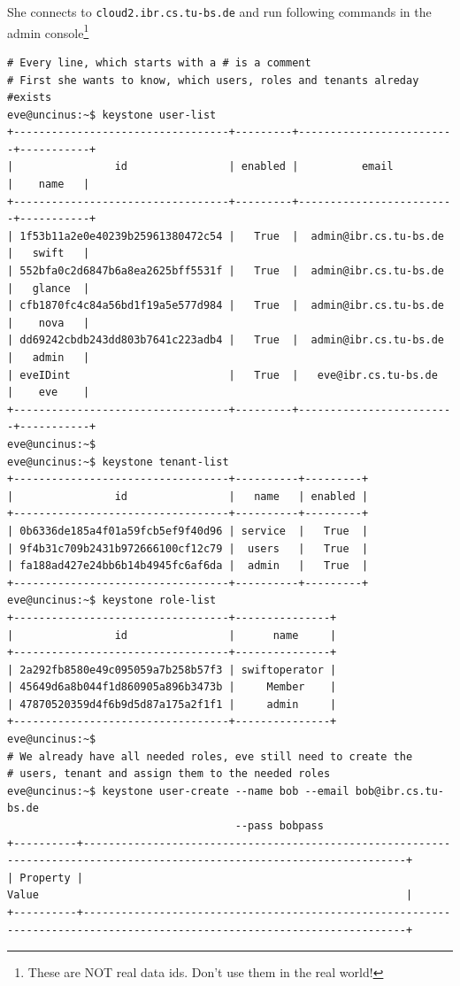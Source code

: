 \documentclass[a4paper,bibtotoc,english,liststotoc]{scrartcl}
\begin{document}
She connects to \verb|cloud2.ibr.cs.tu-bs.de| and run following
commands in the admin console\footnote{These are NOT real data
  ids. Don't use them in the real world!}
\begin{verbatim}
# Every line, which starts with a # is a comment
# First she wants to know, which users, roles and tenants alreday
#exists
eve@uncinus:~$ keystone user-list
+----------------------------------+---------+-------------------------+-----------+
|                id                | enabled |          email          |    name   |
+----------------------------------+---------+-------------------------+-----------+
| 1f53b11a2e0e40239b25961380472c54 |   True  |  admin@ibr.cs.tu-bs.de  |   swift   |
| 552bfa0c2d6847b6a8ea2625bff5531f |   True  |  admin@ibr.cs.tu-bs.de  |   glance  |
| cfb1870fc4c84a56bd1f19a5e577d984 |   True  |  admin@ibr.cs.tu-bs.de  |    nova   |
| dd69242cbdb243dd803b7641c223adb4 |   True  |  admin@ibr.cs.tu-bs.de  |   admin   |
| eveIDint                         |   True  |   eve@ibr.cs.tu-bs.de   |    eve    |
+----------------------------------+---------+-------------------------+-----------+
eve@uncinus:~$
eve@uncinus:~$ keystone tenant-list
+----------------------------------+----------+---------+
|                id                |   name   | enabled |
+----------------------------------+----------+---------+
| 0b6336de185a4f01a59fcb5ef9f40d96 | service  |   True  |
| 9f4b31c709b2431b972666100cf12c79 |  users   |   True  |
| fa188ad427e24bb6b14b4945fc6af6da |  admin   |   True  |
+----------------------------------+----------+---------+
eve@uncinus:~$ keystone role-list
+----------------------------------+---------------+
|                id                |      name     |
+----------------------------------+---------------+
| 2a292fb8580e49c095059a7b258b57f3 | swiftoperator |
| 45649d6a8b044f1d860905a896b3473b |     Member    |
| 47870520359d4f6b9d5d87a175a2f1f1 |     admin     |
+----------------------------------+---------------+
eve@uncinus:~$
# We already have all needed roles, eve still need to create the
# users, tenant and assign them to the needed roles
eve@uncinus:~$ keystone user-create --name bob --email bob@ibr.cs.tu-bs.de 
                                    --pass bobpass
+----------+-------------------------------------------------------------------------------------------------------------------------+
| Property |                                                          Value                                                          |
+----------+-------------------------------------------------------------------------------------------------------------------------+

\end{verbatim}
\end{document}
